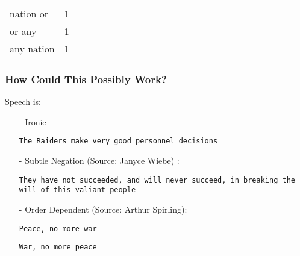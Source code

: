 \documentclass{beamer}
\numberwithin{equation}{section}
\begin{document}
\begin{frame}
{\begin{tabular}{ll}
nation or & 1  \\
or any & 1   \\
any nation & 1
\end{tabular}}


\pause \pause \pause 


\end{frame}




\begin{frame}
\frametitle{How Could This Possibly Work?}


Speech is: 
\begin{itemize}
\item[-] Ironic
\item[] {\tt The Raiders make very good personnel decisions }
\item[-] Subtle Negation (Source: Janyce Wiebe) : 
\item[] {\tt They have not succeeded, and will never succeed, in breaking the will of this valiant people}
\item[-] Order Dependent (Source: Arthur Spirling): 
\item[]{\tt Peace, no more war}
\item[]{\tt War, no more peace}
\end{itemize}


\end{frame}
\end{document}
